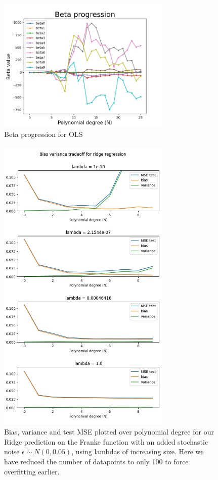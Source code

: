 \documentclass[twocolumn,10pt,cleanfoot]{asme2ej}
\begin{document}
\begin{figure}
\centerline{\includegraphics[width=3.25in]{figure/frankenoisybeta.png}}
\caption{Beta progression for OLS}
\label{frankenoisybeta}
\end{figure}

\begin{figure} 
\centerline{\includegraphics[width=3.25in]{figure/frankiedifflambdas.png}}
\caption{Bias, variance and test MSE plotted over polynomial degree for our Ridge prediction on the Franke function with an added stochastic noise $\epsilon \sim N(0,0.05)$, using lambdas of increasing size. Here we have reduced the number of datapoints to only 100 to force overfitting earlier.}
\label{frankiedifflambdas}
\end{figure}
\end{document}
